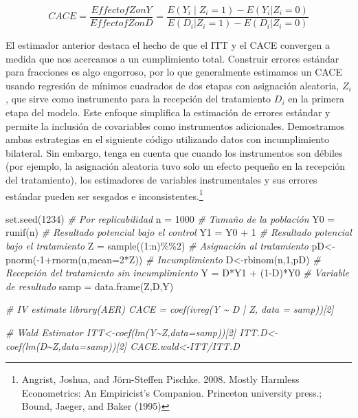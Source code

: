 \documentclass[
]{article}
\newenvironment{Shaded}{\begin{snugshade}}{\end{snugshade}}
\newcommand{\AttributeTok}[1]{\textcolor[rgb]{0.77,0.63,0.00}{#1}}
\newcommand{\CommentTok}[1]{\textcolor[rgb]{0.56,0.35,0.01}{\textit{#1}}}
\newcommand{\DecValTok}[1]{\textcolor[rgb]{0.00,0.00,0.81}{#1}}
\newcommand{\FunctionTok}[1]{\textcolor[rgb]{0.00,0.00,0.00}{#1}}
\newcommand{\NormalTok}[1]{#1}
\newcommand{\OtherTok}[1]{\textcolor[rgb]{0.56,0.35,0.01}{#1}}
\newcommand{\SpecialCharTok}[1]{\textcolor[rgb]{0.00,0.00,0.00}{#1}}
\begin{document}
\[CACE= \frac{Effect of Z on Y}{Effect of Z on D}=\frac{E(Y_i∣Z_i=1)-E(Y_i|Z_i=0)}{E(D_i|Z_i=1)-E(D_i|Z_i=0)}\]

El estimador anterior destaca el hecho de que el ITT y el CACE convergen
a medida que nos acercamos a un cumplimiento total. Construir errores
estándar para fracciones es algo engorroso, por lo que generalmente
estimamos un CACE usando regresión de mínimos cuadrados de dos etapas
con asignación aleatoria, \(Z_i\), que sirve como instrumento para la
recepción del tratamiento \(D_i\) en la primera etapa del modelo. Este
enfoque simplifica la estimación de errores estándar y permite la
inclusión de covariables como instrumentos adicionales. Demostramos
ambas estrategias en el siguiente código utilizando datos con
incumplimiento bilateral. Sin embargo, tenga en cuenta que cuando los
instrumentos son débiles (por ejemplo, la asignación aleatoria tuvo solo
un efecto pequeño en la recepción del tratamiento), los estimadores de
variables instrumentales y sus errores estándar pueden ser sesgados e
inconsistentes.\footnote{Angrist, Joshua, and Jörn-Steffen Pischke.
  2008. Mostly Harmless Econometrics: An Empiricist's Companion.
  Princeton university press.; Bound, Jaeger, and Baker (1995)}

\begin{Shaded}
\begin{Highlighting}[]
\FunctionTok{set.seed}\NormalTok{(}\DecValTok{1234}\NormalTok{) }\CommentTok{\# Por replicabilidad}
\NormalTok{n }\OtherTok{=} \DecValTok{1000} \CommentTok{\# Tamaño de la población}
\NormalTok{Y0 }\OtherTok{=} \FunctionTok{runif}\NormalTok{(n) }\CommentTok{\# Resultado potencial bajo el control}
\NormalTok{Y1 }\OtherTok{=}\NormalTok{ Y0 }\SpecialCharTok{+} \DecValTok{1} \CommentTok{\# Resultado potencial bajo el tratamiento }
\NormalTok{Z }\OtherTok{=} \FunctionTok{sample}\NormalTok{((}\DecValTok{1}\SpecialCharTok{:}\NormalTok{n)}\SpecialCharTok{\%\%}\DecValTok{2}\NormalTok{) }\CommentTok{\# Asignación al tratamiento}
\NormalTok{pD}\OtherTok{\textless{}{-}}\FunctionTok{pnorm}\NormalTok{(}\SpecialCharTok{{-}}\DecValTok{1}\SpecialCharTok{+}\FunctionTok{rnorm}\NormalTok{(n,}\AttributeTok{mean=}\DecValTok{2}\SpecialCharTok{*}\NormalTok{Z)) }\CommentTok{\# Incumplimiento}
\NormalTok{D}\OtherTok{\textless{}{-}}\FunctionTok{rbinom}\NormalTok{(n,}\DecValTok{1}\NormalTok{,pD) }\CommentTok{\# Recepción del tratamiento sin incumplimiento}
\NormalTok{Y }\OtherTok{=}\NormalTok{ D}\SpecialCharTok{*}\NormalTok{Y1 }\SpecialCharTok{+}\NormalTok{ (}\DecValTok{1}\SpecialCharTok{{-}}\NormalTok{D)}\SpecialCharTok{*}\NormalTok{Y0 }\CommentTok{\# Variable de resultado}
\NormalTok{samp }\OtherTok{=} \FunctionTok{data.frame}\NormalTok{(Z,D,Y) }

\CommentTok{\# IV estimate library(AER) CACE = coef(ivreg(Y \textasciitilde{} D | Z, data = samp))[2] }

\CommentTok{\# Wald Estimator ITT\textless{}{-}coef(lm(Y\textasciitilde{}Z,data=samp))[2] ITT.D\textless{}{-}coef(lm(D\textasciitilde{}Z,data=samp))[2] CACE.wald\textless{}{-}ITT/ITT.D}
\end{Highlighting}
\end{Shaded}
\end{document}
